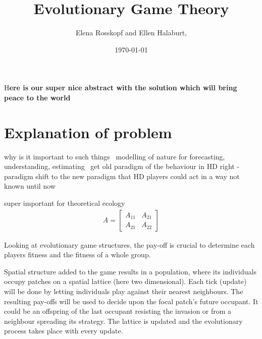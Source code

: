 \documentclass[DIV=calc, paper=a4, fontsize=11pt, twocolumn]{scrartcl}	 %
\title{Evolutionary Game Theory} %
\author{Elena Rosskopf and Ellen Halaburt, } %
\date{\today} %
\newcommand{\initial}[1]{ %
\lettrine[lines=3,lhang=0.3,nindent=0em]{
\color{DarkGoldenrod}
{\textsf{#1}}}{}}
\begin{document}
\maketitle %

\thispagestyle{fancy} %


\initial{H}\textbf{ere is our super nice abstract with the solution which will bring peace to the world}


\section*{Explanation of problem}

\noindent why is it important to such things \
modelling of nature for forecasting, understanding, estimating  \
get old paradigm of the behaviour in HD right - paradigm shift to the new paradigm that HD players could act in a way not known until now

super important for theoretical ecology
\begin{align}
A = 
\begin{bmatrix}
A_{11} & A_{21} \\
A_{21} & A_{22}
\end{bmatrix}
\end{align}

Looking at evolutionary game structures, the pay-off is crucial to determine each players fitness and the fitness of a whole group. 

Spatial structure added to the game results in a population, where its individuals occupy patches on a spatial lattice (here two dimensional). 
Each tick (update) will be done by letting individuals play against their nearest neighbours. The resulting pay-offs will be used to decide upon the focal patch's future occupant. It could be an offspring of the last occupant resisting the invasion or from a neighbour spreading its strategy. The lattice is updated and the evolutionary process takes place with every update.
\end{document}
